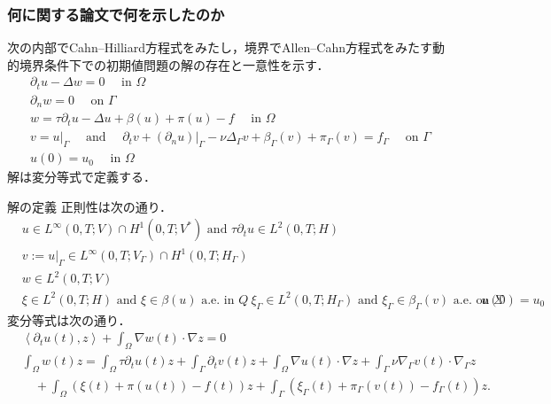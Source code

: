 \documentclass[openary, a4paper, oneside]{jsarticle}
\begin{document}
	\subsubsection{何に関する論文で何を示したのか}
	次の内部でCahn--Hilliard方程式をみたし，境界でAllen--Cahn方程式をみたす動的境界条件下での初期値問題の解の存在と一意性を示す．
	\begin{equation}
		\begin{array}{l}
		\partial_{t} u-\Delta w=0 \quad \text { in } \Omega \\
		\partial_{n} w=0 \quad \text { on } \Gamma \\
		w=\tau \partial_{t} u-\Delta u+\beta(u)+\pi(u)-f \quad \text { in } \Omega \\
		v=\left.u\right|_{\Gamma} \quad \text { and } \quad \partial_{t} v+\left.\left(\partial_{n} u\right)\right|_{\Gamma}-\nu \Delta_{\Gamma} v+\beta_{\Gamma}(v)+\pi_{\Gamma}(v)=f_{\Gamma} \quad \text { on } \Gamma \\
		u(0)=u_{0} \quad \text { in } \Omega
		\end{array}
	\end{equation}
	解は変分等式で定義する．
	\begin{itembox}[l]{解の定義}
		正則性は次の通り．
		\begin{equation}\begin{aligned}
			& u \in L^{\infty}(0, T ; V) \cap H^{1}\left(0, T ; V^{*}\right)\text{ and }\tau \partial_{t} u \in L^{2}(0, T ; H)\\
			& v:=\left.u\right|_{\Gamma} \in L^{\infty}\left(0, T ; V_{\Gamma}\right) \cap H^{1}\left(0, T ; H_{\Gamma}\right)\\
			& w \in L^{2}(0, T ; V)\\
			& \xi \in L^{2}(0, T ; H)\text{ and }\xi \in \beta(u)\text{ a.e. in }Q\ \xi_{\Gamma} \in L^{2}\left(0, T ; H_{\Gamma}\right)\text{ and }\xi_{\Gamma} \in \beta_{\Gamma}(v)\text{ a.e. on }\Sigma
			& u(0)=u_{0}
		\end{aligned}\end{equation}
		変分等式は次の通り．
		\begin{equation}\begin{aligned}
			& \left\langle\partial_{t} u(t), z\right\rangle+\int_{\Omega} \nabla w(t) \cdot \nabla z=0\\
			& \int_{\Omega} w(t) z=\int_{\Omega} \tau \partial_{t} u(t) z+\int_{\Gamma} \partial_{t} v(t) z+\int_{\Omega} \nabla u(t) \cdot \nabla z+\int_{\Gamma} \nu \nabla_{\Gamma} v(t) \cdot \nabla_{\Gamma} z\\
			& \quad +\int_{\Omega}(\xi(t)+\pi(u(t))-f(t)) z+\int_{\Gamma}\left(\xi_{\Gamma}(t)+\pi_{\Gamma}(v(t))-f_{\Gamma}(t)\right) z. 
		\end{aligned}\end{equation}
	\end{itembox}
\end{document}
